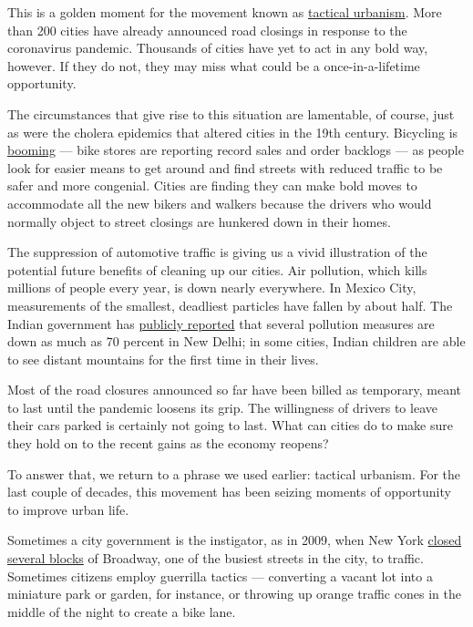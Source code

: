 This is a golden moment for the movement known as
\href{http://tacticalurbanismguide.com/about/}{tactical urbanism}. More
than 200 cities have already announced road closings in response to the
coronavirus pandemic. Thousands of cities have yet to act in any bold
way, however. If they do not, they may miss what could be a
once-in-a-lifetime opportunity.

The circumstances that give rise to this situation are lamentable, of
course, just as were the cholera epidemics that altered cities in the
19th century. Bicycling is
\href{https://www.nytimes.com/2020/05/18/nyregion/bike-shortage-coronavirus.html}{booming}
--- bike stores are reporting record sales and order backlogs --- as
people look for easier means to get around and find streets with reduced
traffic to be safer and more congenial. Cities are finding they can make
bold moves to accommodate all the new bikers and walkers because the
drivers who would normally object to street closings are hunkered down
in their homes.

The suppression of automotive traffic is giving us a vivid illustration
of the potential future benefits of cleaning up our cities. Air
pollution, which kills millions of people every year, is down nearly
everywhere. In Mexico City, measurements of the smallest, deadliest
particles have fallen by about half. The Indian government has
\href{https://www.news18.com/news/india/locked-under-blue-skies-air-quality-and-the-pandemic-2612719.html}{publicly
reported} that several pollution measures are down as much as 70 percent
in New Delhi; in some cities, Indian children are able to see distant
mountains for the first time in their lives.

Most of the road closures announced so far have been billed as
temporary, meant to last until the pandemic loosens its grip. The
willingness of drivers to leave their cars parked is certainly not going
to last. What can cities do to make sure they hold on to the recent
gains as the economy reopens?

To answer that, we return to a phrase we used earlier: tactical
urbanism. For the last couple of decades, this movement has been seizing
moments of opportunity to improve urban life.

Sometimes a city government is the instigator, as in 2009, when New York
\href{https://www.nytimes.com/2009/05/25/nyregion/25bway.html}{closed
several blocks} of Broadway, one of the busiest streets in the city, to
traffic. Sometimes citizens employ guerrilla tactics --- converting a
vacant lot into a miniature park or garden, for instance, or throwing up
orange traffic cones in the middle of the night to create a bike lane.

